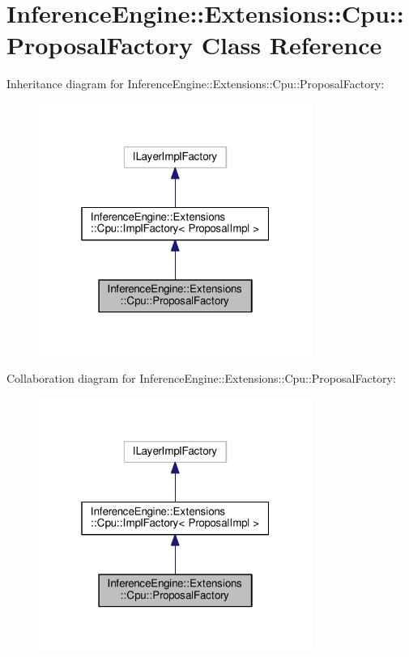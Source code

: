 \hypertarget{classInferenceEngine_1_1Extensions_1_1Cpu_1_1ProposalFactory}{}\section{Inference\+Engine\+:\+:Extensions\+:\+:Cpu\+:\+:Proposal\+Factory Class Reference}
\label{classInferenceEngine_1_1Extensions_1_1Cpu_1_1ProposalFactory}


Inheritance diagram for Inference\+Engine\+:\+:Extensions\+:\+:Cpu\+:\+:Proposal\+Factory\+:
\nopagebreak
\begin{figure}[H]
\begin{center}
\leavevmode
\includegraphics[width=253pt]{classInferenceEngine_1_1Extensions_1_1Cpu_1_1ProposalFactory__inherit__graph}
\end{center}
\end{figure}


Collaboration diagram for Inference\+Engine\+:\+:Extensions\+:\+:Cpu\+:\+:Proposal\+Factory\+:
\nopagebreak
\begin{figure}[H]
\begin{center}
\leavevmode
\includegraphics[width=253pt]{classInferenceEngine_1_1Extensions_1_1Cpu_1_1ProposalFactory__coll__graph}
\end{center}
\end{figure}
